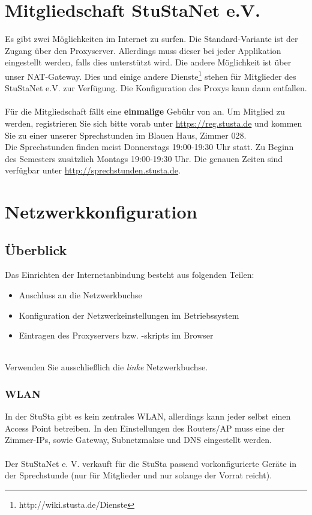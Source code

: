 \documentclass[a4paper,12pt]{scrartcl}
\begin{document}
\section*{Mitgliedschaft StuStaNet e.V.}
Es gibt zwei Möglichkeiten im Internet zu surfen. Die Standard-Variante ist der Zugang über den Proxyserver. Allerdings muss dieser bei jeder Applikation eingestellt werden, falls dies unterstützt wird. Die andere Möglichkeit ist über unser NAT-Gateway. Dies und einige andere Dienste\footnote{http://wiki.stusta.de/Dienste} stehen für Mitglieder des StuStaNet e.V. zur Verfügung. Die Konfiguration des Proxys kann dann entfallen.
\\
\\
Für die Mitgliedschaft fällt eine \textbf{einmalige} Gebühr von  an. Um Mitglied zu werden, registrieren Sie sich bitte vorab unter \url{https://reg.stusta.de} und kommen Sie zu einer unserer Sprechstunden im Blauen Haus, Zimmer 028. 
\\
Die Sprechstunden finden meist Donnerstags 19:00-19:30 Uhr statt. Zu Beginn des Semesters zusätzlich Montags 19:00-19:30 Uhr. Die genauen Zeiten sind verfügbar unter \url{http://sprechstunden.stusta.de}.

\section*{Netzwerkkonfiguration}
\subsection*{Überblick}

Das Einrichten der Internetanbindung besteht aus folgenden Teilen:
\begin{itemize}
	\item Anschluss an die Netzwerkbuchse
	\item Konfiguration der Netzwerkeinstellungen im Betriebssystem
	\item Eintragen des Proxyservers bzw. -skripts im Browser
\end{itemize}
\\
Verwenden Sie ausschließlich die \emph{linke} Netzwerkbuchse. 
 


\subsubsection*{WLAN}
In der StuSta gibt es kein zentrales WLAN, allerdings kann jeder selbst einen Access Point betreiben. In den Einstellungen des Routers/AP muss eine der Zimmer-IPs, sowie Gateway, Subnetzmakse und DNS eingestellt werden.
\\
\\
Der StuStaNet e. V. verkauft für die StuSta passend vorkonfigurierte Geräte in der Sprechstunde (nur für Mitglieder und nur solange der Vorrat reicht).
\end{document}
